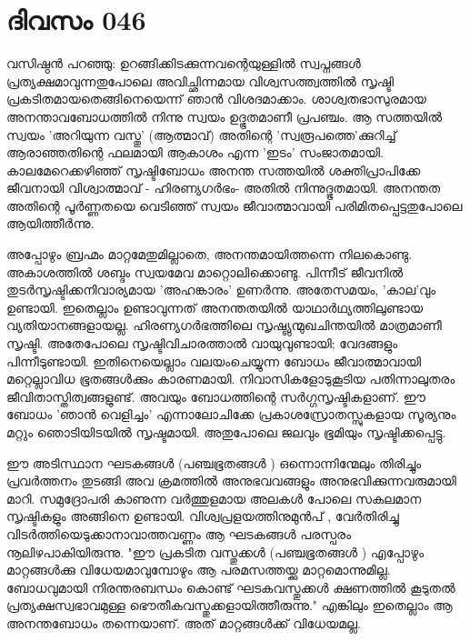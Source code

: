\newpage
\section{ദിവസം 046}


വസിഷ്ഠന്‍ പറഞ്ഞു: ഉറങ്ങിക്കിടക്കുന്നവന്റെയുള്ളില്‍ സ്വപ്നങ്ങള്‍ പ്രത്യക്ഷമാവുന്നതുപോലെ അവിച്ഛിന്നമായ വിശ്വസത്ത്വത്തില്‍ സൃഷ്ടി പ്രകടിതമായതെങ്ങിനെയെന്ന് ഞാന്‍ വിശദമാക്കാം. ശാശ്വതഭാസുരമായ അനന്താവബോധത്തില്‍ നിന്നു സ്വയം ഉദ്ഭൂതമാണീ പ്രപഞ്ചം. ആ സത്തയില്‍ സ്വയം 'അറിയുന്ന വസ്തു' (ആത്മാവ്‌) അതിന്റെ 'സ്വരൂപത്തെ'ക്കുറിച്ച്‌ ആരാഞ്ഞതിന്റെ ഫലമായി ആകാശം എന്ന 'ഇടം' സംജാതമായി. കാലമേറെക്കഴിഞ്ഞ്‌ സൃഷ്ടിബോധം അനന്ത സത്തയില്‍ ശക്തിപ്രാപിക്കേ ജീവനായി വിശ്വാത്മാവ്‌ - ഹിരണ്യഗര്‍ഭം- അതില്‍ നിന്നുദ്ഭൂതമായി. അനന്തത അതിന്റെ പൂര്‍ണ്ണതയെ വെടിഞ്ഞ്‌ സ്വയം ജീവാത്മാവായി പരിമിതപ്പെട്ടതുപോലെ ആയിത്തീര്‍ന്നു.

അപ്പോഴും ബ്രഹ്മം മാറ്റമേതുമില്ലാതെ, അനന്തമായിത്തന്നെ നിലകൊണ്ടു. അകാശത്തില്‍ ശബ്ദം സ്വയമേവ മാറ്റൊലിക്കൊണ്ടു. പിന്നീട്‌ ജീവനില്‍ തുടര്‍സൃഷ്ടിക്കനിവാര്യമായ 'അഹങ്കാരം' ഉണര്‍ന്നു. അതേസമയം, 'കാല'വും ഉണ്ടായി. ഇതെല്ലാം ഉണ്ടാവുന്നത്‌ അനന്തതയില്‍ യാഥാർഥ്യത്തിലുണ്ടായ വ്യതിയാനങ്ങളായല്ല. ഹിരണ്യഗര്‍ഭത്തിലെ സൃഷ്ട്യുന്മുഖചിന്തയില്‍ മാത്രമാണീ സൃഷ്ടി. അതേപോലെ സൃഷ്ടിവിചാരത്താല്‍ വായുവുണ്ടായി; വേദങ്ങളും പിന്നീടുണ്ടായി. ഇതിനെയെല്ലാം വലയംചെയ്യുന്ന ബോധം ജീവാത്മാവായി മറ്റെല്ലാവിധ ഭൂതങ്ങള്‍ക്കും കാരണമായി. നിവാസികളോടുകൂടിയ പതിന്നാലുതരം ജീവിതാസ്തിത്വങ്ങളുണ്ട്‌. അവയും ബോധത്തിന്റെ സര്‍ഗ്ഗസൃഷ്ടികളാണ്‌. ഈ ബോധം 'ഞാന്‍ വെളിച്ചം' എന്നാലോചിക്കേ പ്രകാശസ്രോതസ്സുകളായ സൂര്യനും മറ്റും ഞൊടിയിടയില്‍ സൃഷ്ടമായി. അതുപോലെ ജലവും ഭൂമിയും സൃഷ്ടിക്കപ്പെട്ടു. 

ഈ അടിസ്ഥാന ഘടകങ്ങള്‍ (പഞ്ചഭൂതങ്ങള്‍ ) ഒന്നൊന്നിന്മേലും തിരിച്ചും പ്രവര്‍ത്തനം തുടങ്ങി അവ ക്രമത്തിൽ അനുഭവവങ്ങളും അനുഭവിക്കുന്നവരുമായി  മാറി. സമുദ്രോപരി കാണുന്ന വര്‍ത്തുളമായ അലകള്‍ പോലെ സകലമാന സൃഷ്ടികളും  അങ്ങിനെ  ഉണ്ടായി. വിശ്വപ്രളയത്തിനുമുന്‍പ്‌ , വേര്‍തിരിച്ചു വിടര്‍ത്തിയെടുക്കാനാവാത്തവണ്ണം ആ ഘടകങ്ങള്‍ പരസ്പരം നൂലിഴപാകിയിരുന്നു. "ഈ പ്രകടിത വസ്തുക്കള്‍ (പഞ്ചഭൂതങ്ങള്‍ ) എപ്പോഴും മാറ്റങ്ങള്‍ക്കു വിധേയമാവുമ്പോഴും ആ പരമസത്തയ്ക്കു മാറ്റമൊന്നുമില്ല. ബോധവുമായി നിരന്തരബന്ധം കൊണ്ട്‌ ഘടകവസ്തുക്കള്‍ ക്ഷണത്തില്‍ കൂടുതല്‍ പ്രത്യക്ഷസ്വഭാവമുള്ള ഭൌതീകവസ്തുക്കളായിത്തീരുന്നു." എങ്കിലും ഇതെല്ലാം ആ അനന്തബോധം തന്നെയാണ്‌. അത്‌ മാറ്റങ്ങള്‍ക്ക്‌ വിധേയമല്ല. 

